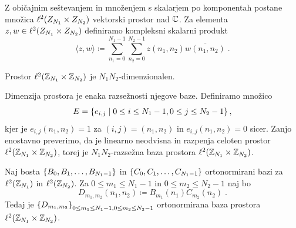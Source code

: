 Z običajnim seštevanjem in množenjem s skalarjem po komponentah postane množica $\ell^2(Z_{N_1} \times Z_{N_2})$ vektorski prostor nad $\mathbb C$. Za elementa $z, w \in \ell^2(Z_{N_1} \times Z_{N_2})$ definiramo kompleksni skalarni produkt
%
\begin{equation}\label{eq:defSP}
  \langle z, w\rangle \coloneqq \sum_{n_1 = 0}^{N_1 - 1} \sum_{n_2 = 0}^{N_2 - 1} z(n_1, n_2)\overline{w(n_1, n_2)} \;.
\end{equation}
%
\begin{trditev}
Prostor $\ell^2(\mathbb Z_{N_1} \times \mathbb Z_{N_2})$ je $N_1 N_2$-dimenzionalen.
\end{trditev}
%
\begin{dokaz}
Dimenzija prostora je enaka razsežnosti njegove baze. Definiramo množico
$$E = \left\{e_{i,j} \mid 0 \leq i \leq N_1-1, 0 \leq j \leq N_2-1\right\},$$
kjer je $e_{i,j}(n_1, n_2) = 1$ za $(i, j) = (n_1, n_2)$ in $e_{i,j}(n_1, n_2) = 0$ sicer. Zanjo enostavno preverimo, da je linearno neodvisna in razpenja celoten prostor $\ell^2(\mathbb Z_{N_1} \times \mathbb Z_{N_2})$, torej je $N_1N_2$-razsežna baza prostora $\ell^2(\mathbb Z_{N_1} \times \mathbb Z_{N_2})$.
\end{dokaz}
%
\begin{izrek}
Naj bosta $\left\{B_0, B_1, \ldots, B_{N_1 - 1}\right\}$ in $\left\{C_0, C_1, \ldots, C_{N_1 - 1}\right\}$ ortonormirani bazi za $\ell^2(\mathbb Z_{N_1})$ in $\ell^2(\mathbb Z_{N_2})$. Za $0 \leq m_1 \leq N_1 - 1$ in $0 \leq m_2 \leq N_2 - 1$ naj bo
$$D_{m_1, m_2}(n_1, n_2) \coloneqq B_{m_1}(n_1)C_{m_2}(n_2) \;.$$
Tedaj je $\left\{D_{m_1, m_2}\right\}_{0 \leq m_1 \leq N_1 - 1, 0 \leq m_2 \leq N_2 - 1}$ ortonormirana baza prostora $\ell^2(\mathbb Z_{N_1} \times \mathbb Z_{N_2})$.
\end{izrek}
%
